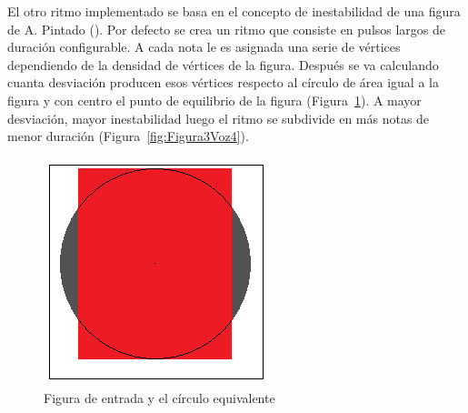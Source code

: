 El otro ritmo implementado se basa en el concepto de inestabilidad de una figura de A. Pintado (\cite{portutesis}). Por defecto se crea un ritmo que consiste en pulsos largos de duración configurable. A cada nota le es asignada una serie de vértices dependiendo de la densidad de vértices de la figura. Después se va calculando cuanta desviación producen esos vértices respecto al círculo de área igual a la figura y con centro el punto de equilibrio de la figura (Figura~\ref{fig:Figura2Voz4}). A mayor desviación, mayor inestabilidad luego el ritmo se subdivide en más notas de menor duración (Figura~\ref{fig:Figura3Voz4}).

		\begin{figure}[htbp]
		\centering
		\hspace*{0.0in}
		\includegraphics[scale=1]{graphics/simpletest2-Circulo.png}
		\caption{Figura de entrada y el círculo equivalente}
		\label{fig:Figura2Voz4}
		\end{figure}

